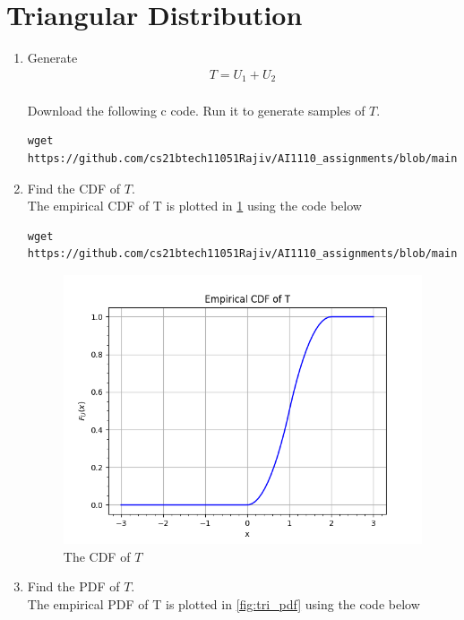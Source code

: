 \documentclass[journal,12pt,twocolumn]{IEEEtran}
\renewcommand\thesection{\arabic{section}}
\begin{document}
\section{Triangular Distribution}
\begin{enumerate}[label=\thesection.\arabic*
,ref=\thesection.\theenumi]
%
\item Generate 
	\begin{align}
		T = U_1+U_2
	\end{align}
\\
\solution Download the following c code. Run it to generate samples of $T$.
\begin{lstlisting}
wget https://github.com/cs21btech11051Rajiv/AI1110_assignments/blob/main/manual1/code/q4/4p1.c
\end{lstlisting}
%
\item Find the CDF of $T$.
\\
\solution The empirical CDF of T is plotted in \ref{fig:tri_cdf} using the code below
\begin{lstlisting}
wget https://github.com/cs21btech11051Rajiv/AI1110_assignments/blob/main/manual1/code/q4/4p2.py
\end{lstlisting}
\begin{figure}[ht!]
	\centering
	\includegraphics[width=\columnwidth]{./figs/fig4.2.png}
	\caption{The CDF of $T$}
	\label{fig:tri_cdf}
\end{figure}
\item Find the PDF of $T$.
\\
\solution The empirical PDF of T is plotted in \ref{fig:tri_pdf} using the code below
\begin{lstlisting}

\end{lstlisting}
\end{enumerate}
\end{document}
